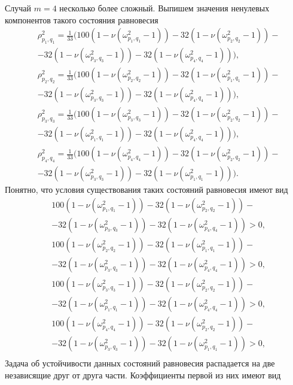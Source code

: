 \documentclass[12pt]{article}  %
\begin{document}
       
	
	Случай $m=4$ несколько более сложный. Выпишем значения ненулевых компонентов такого состояния равновесия
\begin{equation}
\begin{split}
&\rho^2_{p_1,q_1}=\frac{1}{33}(100(1-\nu(\omega^2_{p_1,q_1}-1))-32(1-\nu(\omega^2_{p_2,q_2}-1))-\\
&-32(1-\nu(\omega^2_{p_3,q_3}-1))-32(1-\nu(\omega^2_{p_4,q_4}-1))),\\
&\rho^2_{p_2,q_2}=\frac{1}{33}(100(1-\nu(\omega^2_{p_2,q_2}-1))-32(1-\nu(\omega^2_{p_1,q_1}-1))-\\
&-32(1-\nu(\omega^2_{p_3,q_3}-1))-32(1-\nu(\omega^2_{p_4,q_4}-1))),\\
&\rho^2_{p_3,q_3}=\frac{1}{33}(100(1-\nu(\omega^2_{p_3,q_3}-1))-32(1-\nu(\omega^2_{p_2,q_2}-1))-\\
&-32(1-\nu(\omega^2_{p_1,q_1}-1))-32(1-\nu(\omega^2_{p_4,q_4}-1))),\\
&\rho^2_{p_4,q_4}=\frac{1}{33}(100(1-\nu(\omega^2_{p_4,q_4}-1))-32(1-\nu(\omega^2_{p_2,q_2}-1))-\\
&-32(1-\nu(\omega^2_{p_3,q_3}-1))-32(1-\nu(\omega^2_{p_1,q_1}-1))).
\end{split}
\end{equation}
Понятно, что условия существования таких состояний равновесия имеют вид
\begin{equation}
\begin{split}
&100(1-\nu(\omega^2_{p_1,q_1}-1))-32(1-\nu(\omega^2_{p_2,q_2}-1))-\\
&-32(1-\nu(\omega^2_{p_3,q_3}-1))-32(1-\nu(\omega^2_{p_4,q_4}-1)) > 0, \\
&100(1-\nu(\omega^2_{p_2,q_2}-1))-32(1-\nu(\omega^2_{p_1,q_1}-1))-\\
&-32(1-\nu(\omega^2_{p_3,q_3}-1))-32(1-\nu(\omega^2_{p_4,q_4}-1)) > 0, \\
&100(1-\nu(\omega^2_{p_3,q_3}-1))-32(1-\nu(\omega^2_{p_2,q_2}-1))-\\
&-32(1-\nu(\omega^2_{p_1,q_1}-1))-32(1-\nu(\omega^2_{p_4,q_4}-1)) > 0, \\
&100(1-\nu(\omega^2_{p_4,q_4}-1))-32(1-\nu(\omega^2_{p_2,q_2}-1))-\\
&-32(1-\nu(\omega^2_{p_3,q_3}-1))-32(1-\nu(\omega^2_{p_1,q_1}-1)) > 0, \\
\end{split}
\end{equation}
Задача об устойчивости данных состояний равновесия распадается на две независящие друг от друга части. Коэффициенты первой из них имеют вид
\end{document}
